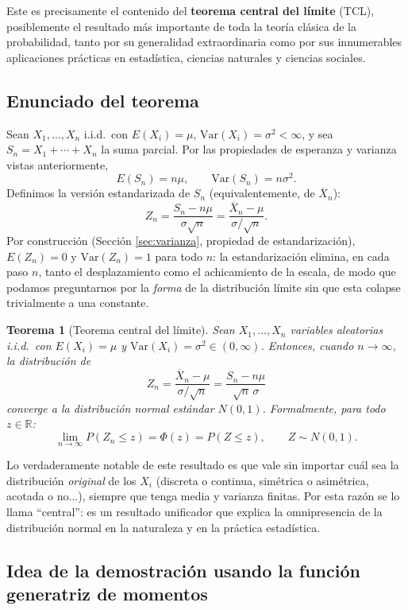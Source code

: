 \documentclass[11pt,a4paper]{article}
\theoremstyle{plain}
\newtheorem{teorema}{Teorema}[section]
\theoremstyle{definition}
\theoremstyle{remark}
\begin{document}
Este es precisamente el contenido del \textbf{teorema central del límite} (TCL), posiblemente el resultado más importante de toda la teoría clásica de la probabilidad, tanto por su generalidad extraordinaria como por sus innumerables aplicaciones prácticas en estadística, ciencias naturales y ciencias sociales.

\subsection{Enunciado del teorema}

Sean $X_1,\dots,X_n$ i.i.d.\ con $E(X_i)=\mu$, $\text{Var}(X_i)=\sigma^2<\infty$, y sea $S_n=X_1+\cdots+X_n$ la suma parcial. Por las propiedades de esperanza y varianza vistas anteriormente,
\[
E(S_n) = n\mu, \qquad \text{Var}(S_n) = n\sigma^2.
\]
Definimos la versión estandarizada de $S_n$ (equivalentemente, de $\overline{X}_n$):
\[
Z_n = \frac{S_n-n\mu}{\sigma\sqrt{n}} = \frac{\overline{X}_n-\mu}{\sigma/\sqrt{n}}.
\]
Por construcción (Sección \ref{sec:varianza}, propiedad de estandarización), $E(Z_n)=0$ y $\text{Var}(Z_n)=1$ para todo $n$: la estandarización elimina, en cada paso $n$, tanto el desplazamiento como el achicamiento de la escala, de modo que podamos preguntarnos por la \emph{forma} de la distribución límite sin que esta colapse trivialmente a una constante.

\begin{teorema}[Teorema central del límite]
Sean $X_1,\dots,X_n$ variables aleatorias i.i.d.\ con $E(X_i)=\mu$ y $\text{Var}(X_i)=\sigma^2\in(0,\infty)$. Entonces, cuando $n\to\infty$, la distribución de
\[
Z_n = \frac{\overline{X}_n-\mu}{\sigma/\sqrt n} = \frac{S_n-n\mu}{\sqrt n\,\sigma}
\]
converge a la distribución normal estándar $N(0,1)$. Formalmente, para todo $z\in\mathbb{R}$:
\[
\lim_{n\to\infty} P(Z_n\leq z) = \Phi(z) = P(Z\leq z), \qquad Z\sim N(0,1).
\]
\end{teorema}

Lo verdaderamente notable de este resultado es que vale sin importar cuál sea la distribución \emph{original} de los $X_i$ (discreta o continua, simétrica o asimétrica, acotada o no...), siempre que tenga media y varianza finitas. Por esta razón se lo llama ``central'': es un resultado unificador que explica la omnipresencia de la distribución normal en la naturaleza y en la práctica estadística.

\subsection{Idea de la demostración usando la función generatriz de momentos}
\end{document}
